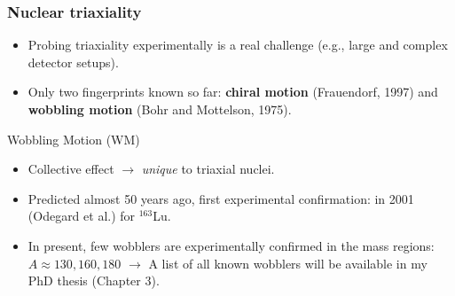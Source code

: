 \documentclass{beamer}
\begin{document}
\begin{frame}
  \frametitle{Nuclear triaxiality}

\begin{itemize}
  \item Probing triaxiality experimentally is a real challenge (e.g., large and complex detector setups).
  \item Only two fingerprints known so far: \textbf{chiral motion} (Frauendorf, 1997) and \textbf{wobbling motion} (Bohr and Mottelson, 1975).
\end{itemize}

\begin{block}{Wobbling Motion (WM)}
  \begin{itemize}
    \item Collective effect $\rightarrow$ \emph{unique} to triaxial nuclei.
    \item Predicted almost 50 years ago, first experimental confirmation: in 2001 (Odegard et al.) for $^{163}$Lu.
    \item In present, few wobblers are experimentally confirmed in the mass regions: $A\approx130,160,180$ $\rightarrow$ {\color{brown}A list of all known wobblers will be available in my PhD thesis (Chapter 3)}. 
  \end{itemize}
\end{block}

\end{frame}
\end{document}
